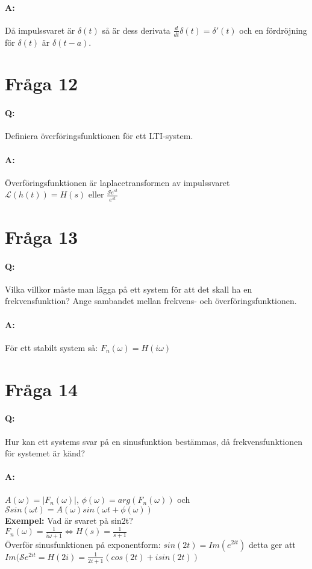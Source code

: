 \documentclass[a4paper]{article}
\begin{document}
\paragraph{A:} Då impulssvaret är $\delta(t)$ så är dess derivata $\frac{d}{dt}\delta(t)=\delta'(t)$ och en fördröjning för $\delta(t)$ är $\delta(t-a)$. 

\section{Fråga 12}
\paragraph{Q:} Definiera överföringsfunktionen för ett LTI-system.
\paragraph{A:} Överföringsfunktionen är laplacetransformen av impulssvaret\\$\mathcal{L}(h(t)) = H(s)$ eller $\frac{\mathcal{S}e^{st}}{e^{st}}$

\section{Fråga 13}
\paragraph{Q:} Vilka villkor måste man lägga på ett system för att det skall ha en frekvensfunktion? Ange sambandet mellan frekvens- och överföringsfunktionen.
\paragraph{A:} För ett stabilt system så: $F_n(\omega) = H(i\omega)$
\newpage

\section{Fråga 14}
\paragraph{Q:} Hur kan ett systems svar på en sinusfunktion bestämmas, då frekvensfunktionen för systemet är känd?
\paragraph{A:} $A(\omega)=|F_n(\omega)|$, $\phi(\omega)=arg(F_n(\omega))$ och $\mathcal{S}sin(\omega t) = A(\omega)sin(\omega t + \phi(\omega))$ \\
\textbf{Exempel:} Vad är svaret på sin2t?\\$F_n(\omega) = \frac{1}{i\omega + 1} \Leftrightarrow H(s)=\frac{1}{s+1}$\\Överför sinusfunktionen på exponentform: $sin(2t) = Im(e^{2it})$ detta ger att $Im(\mathcal{S}e^{2it}=H(2i)=\frac{1}{2i+1}(cos(2t)+isin(2t))$
\end{document}
